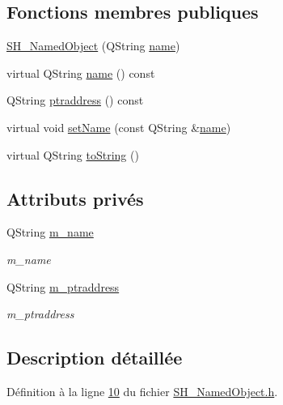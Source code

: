 \subsection*{Fonctions membres publiques}
\begin{DoxyCompactItemize}
\item 
\hyperlink{classSH__NamedObject_a6ceff219e80ad3f5c36db5f4258e74fd}{S\-H\-\_\-\-Named\-Object} (Q\-String \hyperlink{classSH__NamedObject_a9f686c6f2a5bcc08ad03d0cee0151f0f}{name})
\item 
virtual Q\-String \hyperlink{classSH__NamedObject_a9f686c6f2a5bcc08ad03d0cee0151f0f}{name} () const 
\item 
Q\-String \hyperlink{classSH__NamedObject_a147d0e52d9f0fc1d3a423d02f82325f5}{ptraddress} () const 
\item 
virtual void \hyperlink{classSH__NamedObject_a6bc164e6fa10ae190770529af75d1775}{set\-Name} (const Q\-String \&\hyperlink{classSH__NamedObject_a9f686c6f2a5bcc08ad03d0cee0151f0f}{name})
\item 
virtual Q\-String \hyperlink{classSH__NamedObject_a9f4b19df6a96a17daaf1060b3019ef47}{to\-String} ()
\end{DoxyCompactItemize}
\subsection*{Attributs privés}
\begin{DoxyCompactItemize}
\item 
Q\-String \hyperlink{classSH__NamedObject_a7f8e3346256986c337a792339ea5a015}{m\-\_\-name}
\begin{DoxyCompactList}\small\item\em m\-\_\-name \end{DoxyCompactList}\item 
Q\-String \hyperlink{classSH__NamedObject_acfc489299f90750082785bf9ac42f4ff}{m\-\_\-ptraddress}
\begin{DoxyCompactList}\small\item\em m\-\_\-ptraddress \end{DoxyCompactList}\end{DoxyCompactItemize}


\subsection{Description détaillée}


Définition à la ligne \hyperlink{SH__NamedObject_8h_source_l00010}{10} du fichier \hyperlink{SH__NamedObject_8h_source}{S\-H\-\_\-\-Named\-Object.\-h}.



